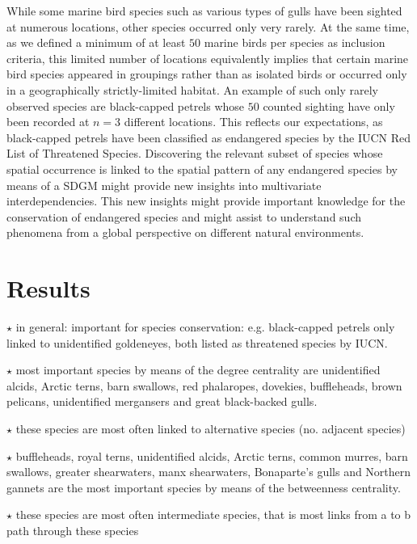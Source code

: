 \documentclass{statsoc}
\begin{document}
While some marine bird species such as various types of gulls have been sighted at numerous locations, other species occurred only very rarely. At the same time, as we defined a minimum of at least $50$ marine birds per species as inclusion criteria, this limited number of locations equivalently implies that certain marine bird species appeared in groupings rather than as isolated birds or occurred only in a geographically strictly-limited habitat. An example of such only rarely observed species are black-capped petrels whose $50$ counted sighting have only been recorded at $n=3$ different locations. This reflects our expectations, as black-capped petrels have been classified as endangered species by the IUCN Red List of Threatened Species. Discovering the relevant subset of species whose spatial occurrence is linked to the spatial pattern of any endangered species  by means of a SDGM might provide new insights into multivariate interdependencies.  This new insights might provide important knowledge for the conservation of endangered species and might assist to understand such phenomena from a global perspective on different natural environments.    

\section{Results}

$\star$ in general: important for species conservation: e.g. black-capped petrels only linked to unidentified goldeneyes, both listed as threatened species by IUCN. 


$\star$ most important species by means of the degree centrality are unidentified alcids, Arctic terns, barn swallows, red phalaropes, dovekies, buffleheads, brown pelicans, unidentified mergansers and great black-backed gulls.


$\star$ these species are most often linked to alternative species (no. adjacent species)


$\star$ buffleheads, royal terns, unidentified alcids, Arctic terns, common murres, barn swallows, greater shearwaters, manx shearwaters, Bonaparte's gulls and Northern gannets are the most important species by means of the betweenness centrality.


$\star$ these species are most often intermediate species, that is most links from a to b path through these species



\end{document}

